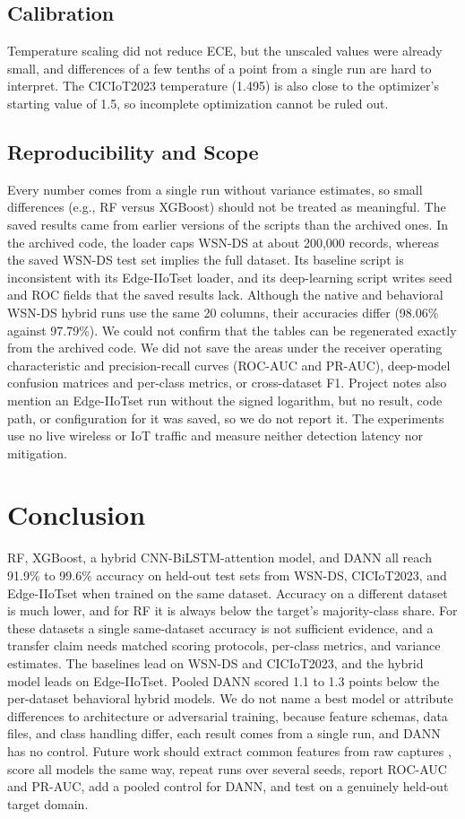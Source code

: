 \documentclass[conference]{IEEEtran}
\begin{document}
\subsection{Calibration}
Temperature scaling did not reduce ECE, but the unscaled values were already small, and differences of a few tenths of a point from a single run are hard to interpret. The CICIoT2023 temperature (1.495) is also close to the optimizer's starting value of 1.5, so incomplete optimization cannot be ruled out.

\subsection{Reproducibility and Scope}\label{sec:limits}
Every number comes from a single run without variance estimates, so small differences (e.g., RF versus XGBoost) should not be treated as meaningful. The saved results came from earlier versions of the scripts than the archived ones. In the archived code, the loader caps WSN-DS at about 200{,}000 records, whereas the saved WSN-DS test set implies the full dataset. Its baseline script is inconsistent with its Edge-IIoTset loader, and its deep-learning script writes seed and ROC fields that the saved results lack. Although the native and behavioral WSN-DS hybrid runs use the same 20 columns, their accuracies differ (98.06\% against 97.79\%). We could not confirm that the tables can be regenerated exactly from the archived code. We did not save the areas under the receiver operating characteristic and precision-recall curves (ROC-AUC and PR-AUC), deep-model confusion matrices and per-class metrics, or cross-dataset F1. Project notes also mention an Edge-IIoTset run without the signed logarithm, but no result, code path, or configuration for it was saved, so we do not report it. The experiments use no live wireless or IoT traffic and measure neither detection latency nor mitigation.

\section{Conclusion}\label{sec:conclusion}
RF, XGBoost, a hybrid CNN-BiLSTM-attention model, and DANN all reach 91.9\% to 99.6\% accuracy on held-out test sets from WSN-DS, CICIoT2023, and Edge-IIoTset when trained on the same dataset. Accuracy on a different dataset is much lower, and for RF it is always below the target's majority-class share. For these datasets a single same-dataset accuracy is not sufficient evidence, and a transfer claim needs matched scoring protocols, per-class metrics, and variance estimates. The baselines lead on WSN-DS and CICIoT2023, and the hybrid model leads on Edge-IIoTset. Pooled DANN scored 1.1 to 1.3 points below the per-dataset behavioral hybrid models. We do not name a best model or attribute differences to architecture or adversarial training, because feature schemas, data files, and class handling differ, each result comes from a single run, and DANN has no control. Future work should extract common features from raw captures \cite{sarhan2021}, score all models the same way, repeat runs over several seeds, report ROC-AUC and PR-AUC, add a pooled control for DANN, and test on a genuinely held-out target domain.
\end{document}
